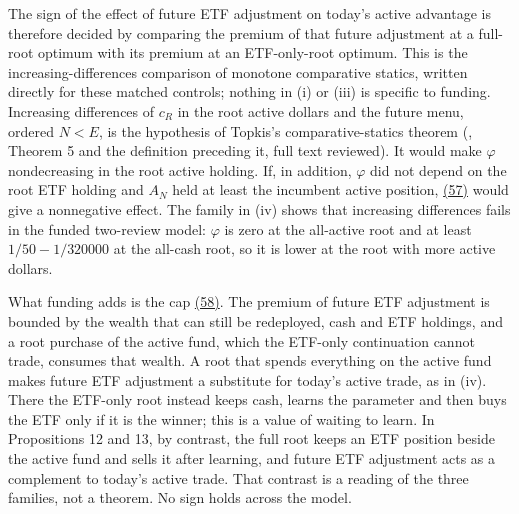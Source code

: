 \documentclass[11pt]{article}
\begin{document}
The sign of the effect of future ETF adjustment on today's
active advantage is therefore decided by comparing the premium
of that future adjustment at a full-root optimum with its
premium at an ETF-only-root optimum. This is the
increasing-differences comparison of monotone comparative
statics, written directly for these matched controls; nothing
in (i) or (iii) is specific to funding. Increasing differences
of \(c_R\) in the root active dollars and the future menu,
ordered \(N<E\), is the hypothesis of Topkis's comparative-statics
theorem (\cite{milgrom1994monotone}, Theorem 5 and the definition
preceding it, full text reviewed). It would make \(\varphi\)
nondecreasing in the root active holding. If, in addition,
\(\varphi\) did not depend on the root ETF holding and \(A_N\)
held at least the incumbent active position, \hyperref[eq:57]{(57)} would give a
nonnegative effect. The family in (iv) shows that increasing
differences fails in the funded two-review model: \(\varphi\)
is zero at the all-active root and at least
\(1/50-1/320000\) at the all-cash root, so it is lower at
the root with more active dollars.

What funding adds is the cap \hyperref[eq:58]{(58)}. The premium of future ETF
adjustment is bounded by the wealth that can still be
redeployed, cash and ETF holdings, and a root purchase of the
active fund, which the ETF-only continuation cannot trade,
consumes that wealth. A root that spends everything on the
active fund makes future ETF adjustment a substitute for today's
active trade, as in (iv). There the ETF-only root instead keeps
cash, learns the parameter and then buys the ETF only if it is
the winner; this is a value of waiting to learn. In Propositions
12 and 13, by contrast, the full root keeps an ETF position
beside the active fund and sells it after learning, and future
ETF adjustment acts as a complement to today's active trade.
That contrast is a reading of the three families, not a
theorem. No sign holds across the model.
\end{document}
